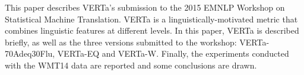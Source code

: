 This paper describes VERTa's submission to the 2015 EMNLP Workshop on Statistical Machine Translation. VERTa is a linguistically-motivated metric that combines linguistic features at different levels. In this paper, VERTa is described briefly, as well as the three versions submitted to the workshop: VERTa-70Adeq30Flu, VERTa-EQ and VERTa-W. Finally, the experiments conducted with the WMT14 data are reported and some conclusions are drawn.
